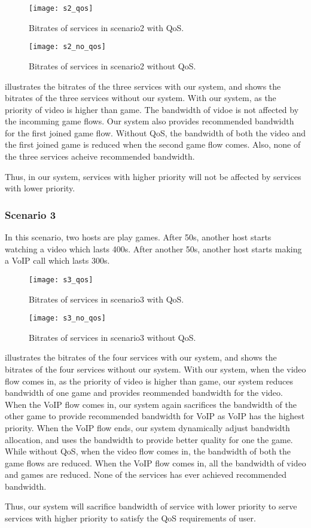 \begin{figure}[htb]
\centering
\texttt{[image: s2\_qos]}
\caption{Bitrates of services in scenario2 with QoS.}
\label{fig:s2_qos}
\end{figure}

\begin{figure}[htb]
\centering
\texttt{[image: s2\_no\_qos]}
\caption{Bitrates of services in scenario2 without QoS.}
\label{fig:s2_no_qos}
\end{figure}

 illustrates the bitrates of the three services with our system, and  shows the bitrates of the three services without our system. 
With our system, as the priority of video is higher than game. The bandwidth of vidoe is not affected by the incomming game flows. Our system also provides recommended bandwidth for the first joined game flow.
Without QoS, the bandwidth of both the video and the first joined game is reduced when the second game flow comes. Also, none of the three services acheive recommended bandwidth.

Thus, in our system, services with higher priority will not be affected by services with lower priority.

\subsubsection{Scenario 3}
In this scenario, two hosts are play games. After 50s, another host starts watching a video which lasts 400s. After another 50s, another host starts making a VoIP call which lasts 300s.

\begin{figure}[htb]
\centering
\texttt{[image: s3\_qos]}
\caption{Bitrates of services in scenario3 with QoS.}
\label{fig:s3_qos}
\end{figure}

\begin{figure}[htb]
\centering
\texttt{[image: s3\_no\_qos]}
\caption{Bitrates of services in scenario3 without QoS.}
\label{fig:s3_no_qos}
\end{figure}

 illustrates the bitrates of the four services with our system, and  shows the bitrates of the four services without our system. 
With our system, when the video flow comes in, as the priority of video is higher than game, our system reduces bandwidth of one game and provides reommended bandwidth for the video. When the VoIP flow comes in, our system again sacrifices the bandwidth of the other game to provide recommended bandwidth for VoIP as VoIP has the highest priority. When the VoIP flow ends, our system dynamically adjust bandwidth allocation, and uses the bandwidth to provide better quality for one the game.
While without QoS, when the video flow comes in, the bandwidth of both the game flows are reduced. When the VoIP flow comes in, all the bandwidth of video and games are reduced. None of the services has ever achieved recommended bandwidth.

Thus, our system will sacrifice bandwidth of service with lower priority to serve services with higher priority to satisfy the QoS requirements of user.

